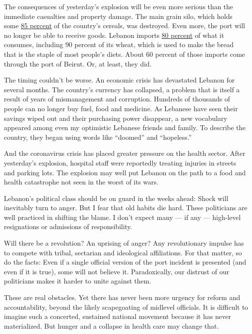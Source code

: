 The consequences of yesterday's explosion will be even more serious than
the immediate casualties and property damage. The main grain silo, which
holds some
\href{https://www.spglobal.com/platts/en/market-insights/latest-news/agriculture/080420-explosion-at-port-of-beirut-damages-grain-silos-terminal-reports}{85
percent} of the country's cereals, was destroyed. Even more, the port
will no longer be able to receive goods. Lebanon imports
\href{https://www.forbes.com/sites/tatianakoffman/2020/07/09/lebanons-currency-crisis-paves-the-way-to-a-new-future/\#69ede21a6a17}{80
percent} of what it consumes, including 90 percent of its wheat, which
is used to make the bread that is the staple of most people's diets.
About 60 percent of those imports come through the port of Beirut. Or,
at least, they did.

The timing couldn't be worse. An economic crisis has devastated Lebanon
for several months. The country's currency has collapsed, a problem that
is itself a result of years of mismanagement and corruption. Hundreds of
thousands of people can no longer buy fuel, food and medicine. As
Lebanese have seen their savings wiped out and their purchasing power
disappear, a new vocabulary appeared among even my optimistic Lebanese
friends and family. To describe the country, they began using words like
``doomed'' and ``hopeless.''

And the coronavirus crisis has placed greater pressure on the health
sector. After yesterday's explosion, hospital staff were reportedly
treating injuries in streets and parking lots. The explosion may well
put Lebanon on the path to a food and health catastrophe not seen in the
worst of its wars.

Lebanon's political class should be on guard in the weeks ahead: Shock
will inevitably turn to anger. But I fear that old habits die hard.
These politicians are well practiced in shifting the blame. I don't
expect many --- if any --- high-level resignations or admissions of
responsibility.

Will there be a revolution? An uprising of anger? Any revolutionary
impulse has to compete with tribal, sectarian and ideological
affiliations. For that matter, so do the facts: Even if a single
official version of the port incident is presented (and even if it is
true), some will not believe it. Paradoxically, our distrust of our
politicians makes it harder to unite against them.

These are real obstacles. Yet there has never been more urgency for
reform and accountability, beyond the likely scapegoating of midlevel
officials. It is difficult to imagine such a concerted, sustained
national movement because it has never materialized. But hunger and a
collapse in health care may change that.

